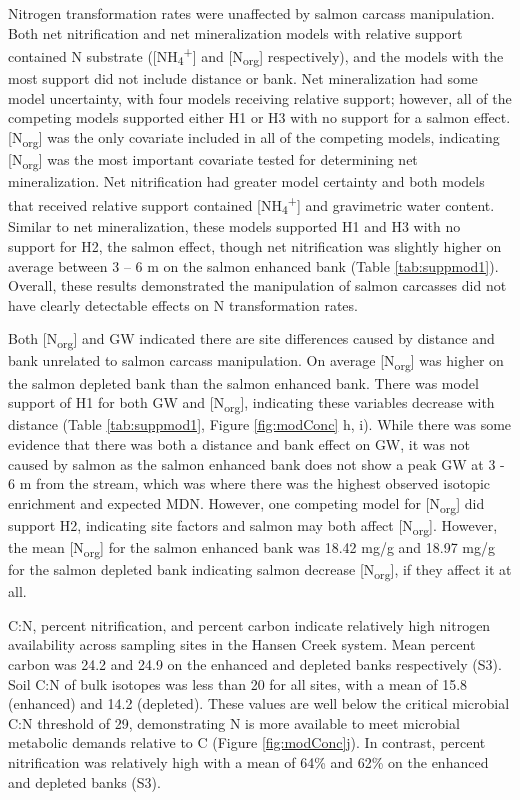 \documentclass [11pt, proquest] {uwthesis}[2015/03/03]
\begin{document}
Nitrogen transformation rates were unaffected by salmon carcass manipulation. Both net nitrification and net mineralization models with relative support contained N substrate ({[}NH\textsubscript{4}\textsuperscript{+}{]} and {[}N\textsubscript{org}{]} respectively), and the models with the most support did not include distance or bank. Net mineralization had some model uncertainty, with four models receiving relative support; however, all of the competing models supported either H1 or H3 with no support for a salmon effect. {[}N\textsubscript{org}{]} was the only covariate included in all of the competing models, indicating {[}N\textsubscript{org}{]} was the most important covariate tested for determining net mineralization. Net nitrification had greater model certainty and both models that received relative support contained {[}NH\textsubscript{4}\textsuperscript{+}{]} and gravimetric water content. Similar to net mineralization, these models supported H1 and H3 with no support for H2, the salmon effect, though net nitrification was slightly higher on average between 3 -- 6 m on the salmon enhanced bank (Table \ref{tab:suppmod1}). Overall, these results demonstrated the manipulation of salmon carcasses did not have clearly detectable effects on N transformation rates.

Both {[}N\textsubscript{org}{]} and GW indicated there are site differences caused by distance and bank unrelated to salmon carcass manipulation. On average {[}N\textsubscript{org}{]} was higher on the salmon depleted bank than the salmon enhanced bank. There was model support of H1 for both GW and {[}N\textsubscript{org}{]}, indicating these variables decrease with distance (Table \ref{tab:suppmod1}, Figure \ref{fig:modConc} h, i). While there was some evidence that there was both a distance and bank effect on GW, it was not caused by salmon as the salmon enhanced bank does not show a peak GW at 3 - 6 m from the stream, which was where there was the highest observed isotopic enrichment and expected MDN. However, one competing model for {[}N\textsubscript{org}{]} did support H2, indicating site factors and salmon may both affect {[}N\textsubscript{org}{]}. However, the mean {[}N\textsubscript{org}{]} for the salmon enhanced bank was 18.42 mg/g and 18.97 mg/g for the salmon depleted bank indicating salmon decrease {[}N\textsubscript{org}{]}, if they affect it at all.\newline 

C:N, percent nitrification, and percent carbon indicate relatively high nitrogen availability across sampling sites in the Hansen Creek system. Mean percent carbon was 24.2 and 24.9 on the enhanced and depleted banks respectively (S3). Soil C:N of bulk isotopes was less than 20 for all sites, with a mean of 15.8 (enhanced) and 14.2 (depleted). These values are well below the critical microbial C:N threshold of 29, demonstrating N is more available to meet microbial metabolic demands relative to C (Figure \ref{fig:modConc}j). In contrast, percent nitrification was relatively high with a mean of 64\% and 62\% on the enhanced and depleted banks (S3).
\end{document}

